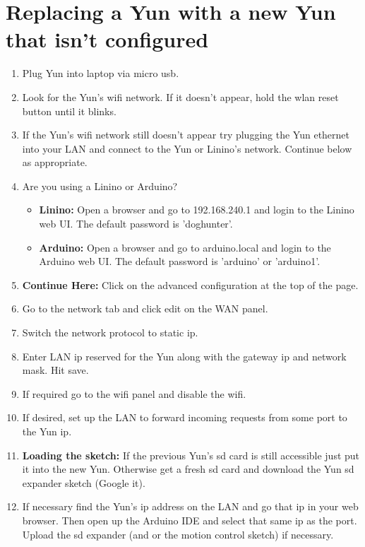 \documentclass[11pt]{article}
\begin{document}
\section{Replacing a Yun with a new Yun that isn't configured}
\label{secYun}
\begin{enumerate}
\item Plug Yun into laptop via micro usb.
\item Look for the Yun's wifi network. If it doesn't appear, hold the wlan reset button until it blinks.
\item If the Yun's wifi network still doesn't appear try plugging the Yun ethernet into your LAN and connect to the Yun or Linino's network. Continue below as appropriate.\\
\item Are you using a Linino or Arduino?
        	\begin{itemize} 
		\item {\textbf{Linino:}} Open a browser and go to 192.168.240.1 and login to the Linino web UI. The default password is 'doghunter'.
		\item {\textbf{Arduino:}} Open a browser and go to arduino.local and login to the Arduino web UI. The default password is 'arduino' or 'arduino1'.
	\end{itemize}
\item \textbf{Continue Here:} Click on the advanced configuration at the top of the page.
\item Go to the network tab and click edit on the WAN panel.
\item Switch the network protocol to static ip.
\item Enter LAN ip reserved for the Yun along with the gateway ip and network mask. Hit save.
\item If required go to the wifi panel and disable the wifi.

\item If desired, set up the LAN to forward incoming requests from some port to the Yun ip.\\
\item \textbf{Loading the sketch:} If the previous Yun's sd card is still accessible just put it into the new Yun. Otherwise get a fresh sd card and download the Yun sd expander sketch (Google it).
\item If necessary find the Yun's ip address on the LAN and go that ip in your web browser. Then open up the Arduino IDE and select that same ip as the port. Upload the sd expander (and or the motion control sketch) if necessary.


\end{enumerate}
\end{document}
